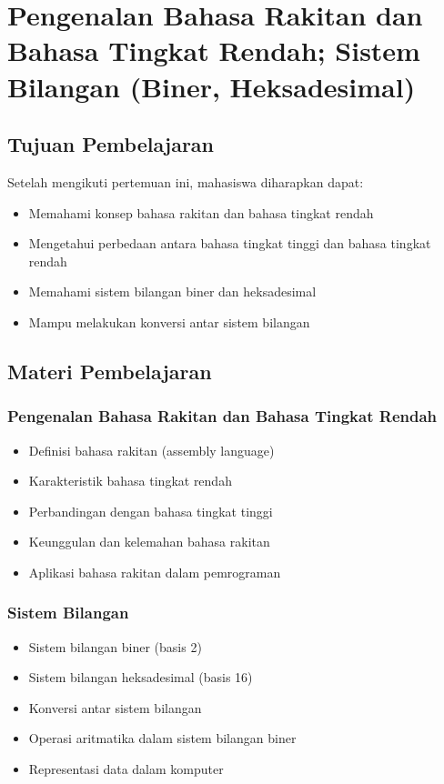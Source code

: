 \chapter{Pengenalan Bahasa Rakitan dan Bahasa Tingkat Rendah; Sistem Bilangan (Biner, Heksadesimal)}

\section{Tujuan Pembelajaran}
Setelah mengikuti pertemuan ini, mahasiswa diharapkan dapat:
\begin{itemize}
\item Memahami konsep bahasa rakitan dan bahasa tingkat rendah
\item Mengetahui perbedaan antara bahasa tingkat tinggi dan bahasa tingkat rendah
\item Memahami sistem bilangan biner dan heksadesimal
\item Mampu melakukan konversi antar sistem bilangan
\end{itemize}

\section{Materi Pembelajaran}

\subsection{Pengenalan Bahasa Rakitan dan Bahasa Tingkat Rendah}
\begin{itemize}
\item Definisi bahasa rakitan (assembly language)
\item Karakteristik bahasa tingkat rendah
\item Perbandingan dengan bahasa tingkat tinggi
\item Keunggulan dan kelemahan bahasa rakitan
\item Aplikasi bahasa rakitan dalam pemrograman
\end{itemize}

\subsection{Sistem Bilangan}
\begin{itemize}
\item Sistem bilangan biner (basis 2)
\item Sistem bilangan heksadesimal (basis 16)
\item Konversi antar sistem bilangan
\item Operasi aritmatika dalam sistem bilangan biner
\item Representasi data dalam komputer
\end{itemize}

